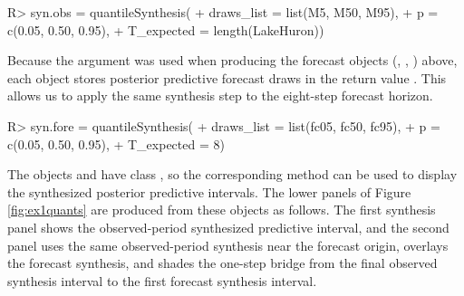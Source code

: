 \documentclass{jss}
\begin{document}
\begin{CodeChunk}
\begin{CodeInput}
R> syn.obs = quantileSynthesis(
+               draws_list = list(M5, M50, M95),
+               p = c(0.05, 0.50, 0.95),
+               T_expected = length(LakeHuron))
\end{CodeInput}
\end{CodeChunk}

Because the argument  was used when producing the forecast objects (, , ) above, each object stores posterior predictive forecast draws in the return value . This allows us to apply the same synthesis step to the eight-step forecast horizon.

\begin{CodeChunk}
\begin{CodeInput}
R> syn.fore = quantileSynthesis(
+               draws_list = list(fc05, fc50, fc95),
+               p = c(0.05, 0.50, 0.95),
+               T_expected = 8)
\end{CodeInput}
\end{CodeChunk}

The objects  and  have class , so the corresponding  method can be used to display the synthesized posterior predictive intervals. The lower panels of Figure \ref{fig:ex1quants} are produced from these objects as follows. The first synthesis panel shows the observed-period synthesized predictive interval, and the second panel uses the same observed-period synthesis near the forecast origin, overlays the forecast synthesis, and shades the one-step bridge from the final observed synthesis interval to the first forecast synthesis interval.
\end{document}
